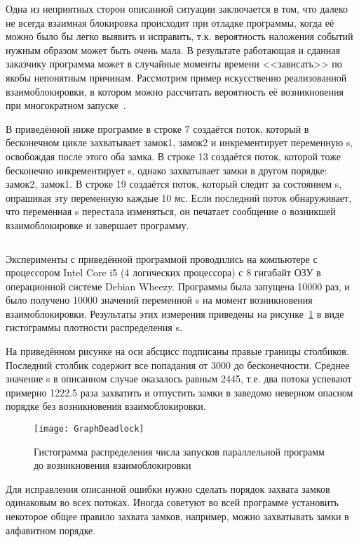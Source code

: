 Одна из неприятных сторон описанной ситуации заключается в том, что далеко не всегда взаимная блокировка происходит при отладке программы, когда её можно было бы легко выявить и исправить, т.к. вероятность наложения событий нужным образом может быть очень мала. В результате работающая и сданная заказчику программа может в случайные моменты времени <<зависать>> по якобы непонятным причинам. Рассмотрим пример искусственно реализованной взаимоблокировки, в котором можно рассчитать вероятность её возникновения при многократном запуске~\cite{Gergel2009}.

В приведённой ниже программе в строке 7 создаётся поток, который в бесконечном цикле захватывает замок1, замок2 и инкрементирует переменную s, освобождая после этого оба замка. В строке 13 создаётся поток, которой тоже бесконечно инкрементирует s, однако захватывает замки в другом порядке: замок2, замок1. В строке 19 создаётся поток, который следит за состоянием s, опрашивая эту переменную каждые 10 мс. Если последний поток обнаруживает, что переменная s перестала изменяться, он печатает сообщение о возникшей взаимоблокировке и завершает программу.  

\inputminted{c++}{listings/deadlockExample.cpp}

Эксперименты с приведённой программой проводились на компьютере с процессором Intel Core i5 (4 логических процессора) с 8 гигабайт ОЗУ в операционной системе Debian Wheezy. Программы была запущена 10000 раз, и было получено 10000 значений переменной s на момент возникновения взаимоблокировки. Результаты этих измерения приведены на рисунке~\ref{GraphDeadlock:image} в виде гистограммы плотности распределения s.

На приведённом рисунке на оси абсцисс подписаны правые границы столбиков. Последний столбик содержит все попадания от 3000 до бесконечности. Среднее значение s в описанном случае оказалось равным 2445, т.е. два потока успевают примерно 1222.5 раза захватить и отпустить замки в заведомо неверном опасном порядке без возникновения взаимоблокировки.

\begin{figure}[H]
    \texttt{[image: GraphDeadlock]}
    \caption{Гистограмма распределения числа запусков параллельной программ до возникновения взаимоблокировки}
    \label{GraphDeadlock:image}
\end{figure}


Для исправления описанной ошибки нужно сделать порядок захвата замков одинаковым во всех потоках. Иногда советуют во всей программе установить некоторое общее правило захвата замков, например, можно захватывать замки в алфавитном порядке.


